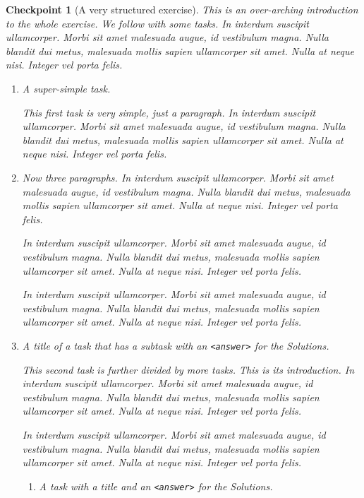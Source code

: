 \documentclass[pdflatex]{sn-jnl}
\theoremstyle{thmstyleone}%
\theoremstyle{thmstyletwo}%
\newtheorem{inlineexercise}[theorem]{Checkpoint}
\theoremstyle{thmstylethree}%
\newcommand{\mono}[1]{\texttt{#1}}
\newcommand{\lititle}[1]{{\slshape#1}}
\numberwithin{equation}{section}
\begin{document}
\begin{inlineexercise}[A very structured exercise]\label{exercise-structured}%
%
This is an over-arching introduction to the whole exercise.  We follow with some tasks.  In interdum suscipit ullamcorper. Morbi sit amet malesuada augue, id vestibulum magna. Nulla blandit dui metus, malesuada mollis sapien ullamcorper sit amet. Nulla at neque nisi. Integer vel porta felis.%
\begin{enumerate}[font=\bfseries,label=(\alph*),ref=\alph*]%
\item{}\lititle{A super-simple task.}\par%
This first task is very simple, just a paragraph.  In interdum suscipit ullamcorper. Morbi sit amet malesuada augue, id vestibulum magna. Nulla blandit dui metus, malesuada mollis sapien ullamcorper sit amet. Nulla at neque nisi. Integer vel porta felis.%
\item{}Now three paragraphs.  In interdum suscipit ullamcorper. Morbi sit amet malesuada augue, id vestibulum magna. Nulla blandit dui metus, malesuada mollis sapien ullamcorper sit amet. Nulla at neque nisi. Integer vel porta felis.%
\par
In interdum suscipit ullamcorper. Morbi sit amet malesuada augue, id vestibulum magna. Nulla blandit dui metus, malesuada mollis sapien ullamcorper sit amet. Nulla at neque nisi. Integer vel porta felis.%
\par
In interdum suscipit ullamcorper. Morbi sit amet malesuada augue, id vestibulum magna. Nulla blandit dui metus, malesuada mollis sapien ullamcorper sit amet. Nulla at neque nisi. Integer vel porta felis.%
\item{}\lititle{A title of a task that has a subtask with an \mono{<answer>} for the Solutions.}\par%
This second task is further divided by more tasks.  This is its introduction.  In interdum suscipit ullamcorper. Morbi sit amet malesuada augue, id vestibulum magna. Nulla blandit dui metus, malesuada mollis sapien ullamcorper sit amet. Nulla at neque nisi. Integer vel porta felis.%
\par
In interdum suscipit ullamcorper. Morbi sit amet malesuada augue, id vestibulum magna. Nulla blandit dui metus, malesuada mollis sapien ullamcorper sit amet. Nulla at neque nisi. Integer vel porta felis.%
\begin{enumerate}[font=\bfseries,label=(\roman*),ref=\theenumi.\roman*]%
\item{}\lititle{A task with a title and an \mono{<answer>} for the Solutions.}\par%

\end{enumerate}
\end{enumerate}
\end{inlineexercise}
\end{document}
